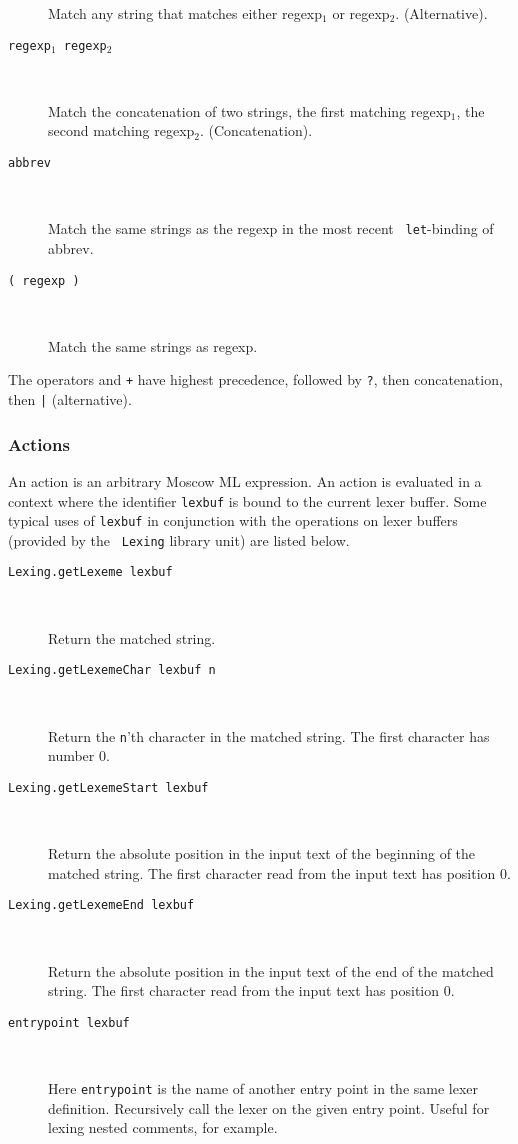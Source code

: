 \documentclass[fleqn]{article}
\begin{document}
\begin{description}
  Match any string that matches either regexp$_1$ or regexp$_2$.
  (Alternative).

\item[{\tt {\rm regexp}$_1$ {\rm regexp}$_2$}]\mbox{ }

  Match the concatenation of two strings, the first matching
  regexp$_1$, the second matching regexp$_2$.  (Concatenation).

\item[{\tt {\rm abbrev} }]\mbox{ }

  Match the same strings as the regexp in the most recent {\tt
    let}-binding of abbrev.

\item[{\tt ( {\rm regexp} )}]\mbox{ }

  Match the same strings as regexp.

\end{description}

\noindent The operators {\tt *} and {\tt +} have highest precedence,
followed by {\tt ?}, then concatenation, then {\tt |} (alternative).


\subsubsection{Actions}

An action is an arbitrary Moscow ML expression.  An action is
evaluated in a context where the identifier {\tt lexbuf} is bound to
the current lexer buffer.  Some typical uses of {\tt lexbuf} in
conjunction with the operations on lexer buffers (provided by the {\tt
  Lexing} library unit) are listed below.

\begin{description}
\item[{\tt Lexing.getLexeme lexbuf}]\mbox{ }

  Return the matched string.

\item[{\tt Lexing.getLexemeChar lexbuf n}]\mbox{ }
 
  Return the {\tt n}'th character in the matched string.  The first
  character has number 0.

\item[{\tt Lexing.getLexemeStart lexbuf}]\mbox{ }

  Return the absolute position in the input text of the beginning of
  the matched string.  The first character read from the input text
  has position 0.

\item[{\tt Lexing.getLexemeEnd lexbuf}]\mbox{ }

  Return the absolute position in the input text of the end of the
  matched string.  The first character read from the input text has
  position 0.

\item[{\tt entrypoint lexbuf}]\mbox{ }

  Here {\tt entrypoint} is the name of another entry point in the same
  lexer definition.  Recursively call the lexer on the given entry
  point.  Useful for lexing nested comments, for example.
\end{description}
\end{document}
